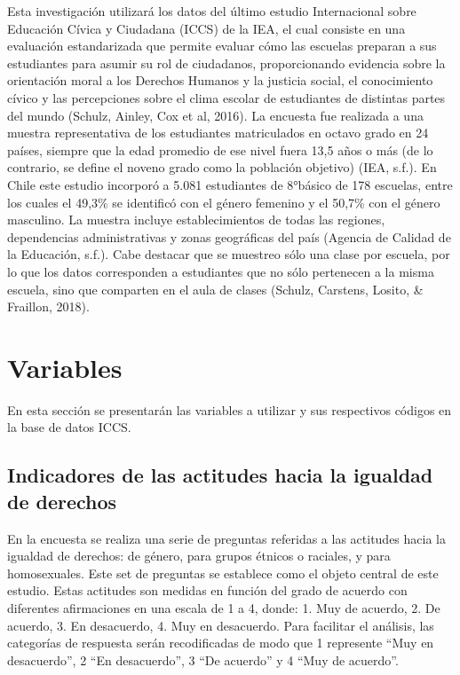 \documentclass[12pt,twoside]{templates/facsothesis}
\begin{document}
Esta investigación utilizará los datos del último estudio Internacional sobre Educación Cívica y Ciudadana (ICCS) de la IEA, el cual consiste en una evaluación estandarizada que permite evaluar cómo las escuelas preparan a sus estudiantes para asumir su rol de ciudadanos, proporcionando evidencia sobre la orientación moral a los Derechos Humanos y la justicia social, el conocimiento cívico y las percepciones sobre el clima escolar de estudiantes de distintas partes del mundo (Schulz, Ainley, Cox et al, 2016). La encuesta fue realizada a una muestra representativa de los estudiantes matriculados en octavo grado en 24 países, siempre que la edad promedio de ese nivel fuera 13,5 años o más (de lo contrario, se define el noveno grado como la población objetivo) (IEA, s.f.). En Chile este estudio incorporó a 5.081 estudiantes de 8°básico de 178 escuelas, entre los cuales el 49,3\% se identificó con el género femenino y el 50,7\% con el género masculino. La muestra incluye establecimientos de todas las regiones, dependencias administrativas y zonas geográficas del país (Agencia de Calidad de la Educación, s.f.). Cabe destacar que se muestreo sólo una clase por escuela, por lo que los datos corresponden a estudiantes que no sólo pertenecen a la misma escuela, sino que comparten en el aula de clases (Schulz, Carstens, Losito, \& Fraillon, 2018).

\hypertarget{variables}{%
\section{Variables}\label{variables}}

En esta sección se presentarán las variables a utilizar y sus respectivos códigos en la base de datos ICCS.

\hypertarget{indicadores-de-las-actitudes-hacia-la-igualdad-de-derechos}{%
\subsection{Indicadores de las actitudes hacia la igualdad de derechos}\label{indicadores-de-las-actitudes-hacia-la-igualdad-de-derechos}}

En la encuesta se realiza una serie de preguntas referidas a las actitudes hacia la igualdad de derechos: de género, para grupos étnicos o raciales, y para homosexuales. Este set de preguntas se establece como el objeto central de este estudio. Estas actitudes son medidas en función del grado de acuerdo con diferentes afirmaciones en una escala de 1 a 4, donde: 1. Muy de acuerdo, 2. De acuerdo, 3. En desacuerdo, 4. Muy en desacuerdo. Para facilitar el análisis, las categorías de respuesta serán recodificadas de modo que 1 represente ``Muy en desacuerdo'', 2 ``En desacuerdo'', 3 ``De acuerdo'' y 4 ``Muy de acuerdo''.
\end{document}

